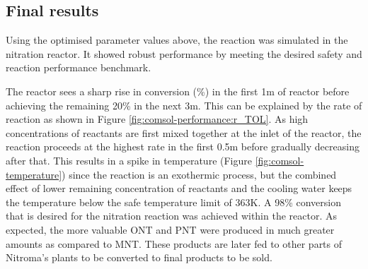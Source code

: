 \subsection{Final results}
\label{finalresults}
Using the optimised parameter values above, the reaction was simulated in the nitration reactor. It showed robust performance by meeting the desired safety and reaction performance benchmark.

The reactor sees a sharp rise in conversion (\%) in the first 1m of reactor before achieving the remaining 20\% in the next \approx 3m. This can be explained by the rate of reaction as shown in Figure \ref{fig:comsol-performance:r_TOL}. As high concentrations of reactants are first mixed together at the inlet of the reactor, the reaction proceeds at the highest rate in the first 0.5m before gradually decreasing after that. This results in a spike in temperature (Figure \ref{fig:comsol-temperature}) since the reaction is an exothermic process, but the combined effect of lower remaining concentration of reactants and the cooling water keeps the temperature below the safe temperature limit of 363K. A 98\% conversion that is desired for the nitration reaction was achieved within the reactor. As expected, the more valuable ONT and PNT were produced in much greater amounts as compared to MNT. These products are later fed to other parts of Nitroma's plants to be converted to final products to be sold.

